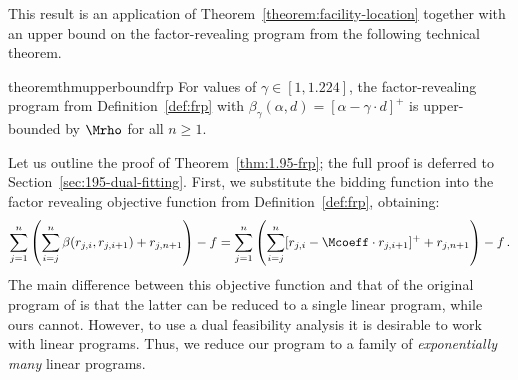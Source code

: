 This result is an application of Theorem~\ref{theorem:facility-location} together with an upper bound on the factor-revealing program from the following technical theorem.
\begin{restatable}{theorem}{thmupperboundfrp}\label{thm:1.95-frp}
    For values of $\gamma\in [1,1.224]$, the factor-revealing program from Definition~\ref{def:frp} with $\beta_\gamma(\alpha,d)=[\alpha-\gamma\cdot d]^+$ is upper-bounded by $\Mrho$ for all $n \geq 1$.
\end{restatable}

Let us outline the proof of Theorem~\ref{thm:1.95-frp}; the full proof is deferred to Section~\ref{sec:195-dual-fitting}.
First, we substitute the bidding function into the factor revealing objective function from Definition~\ref{def:frp}, obtaining:
\begin{equation*}
    \sum_{j=1}^{n} \left(\sum_{i=j}^{n} \beta(r_{j,i}, r_{j,i+1})  + r_{j,n+1} \right) - f
    = \sum_{j=1}^{n} \left(\sum_{i=j}^{n} [r_{j,i} - \Mcoeff \cdot r_{j,i+1}]^+  + r_{j,n+1} \right) - f\,.
\end{equation*}
The main difference between this objective function and that of the original program of \cite{JMS02,JainMMSV03} is that the latter can be reduced to a single linear program, while ours cannot. 
However, to use a dual feasibility analysis it is desirable to work with linear programs.
Thus, we reduce our program to a family of \emph{exponentially many} linear programs.

